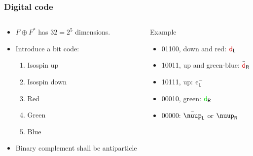 \documentclass[english, fleqn]{beamer}
\renewcommand\eup{\text e}
\begin{document}
\begin{frame}
    \frametitle{Digital code}

    \begin{columns}[t]
        \begin{column}{0.5\linewidth}
            \begin{itemize}
                \item
                    $F \oplus F^*$ has $32 = 2^5$ dimensions.
                \pause
                \item
                    Introduce a bit code:
                    \begin{enumerate}
                        \item Isospin up
                        \item Isospin down
                        \item \textcolor{qred}{Red}
                        \item \textcolor{qgreen}{Green}
                        \item \textcolor{qblue}{Blue}
                    \end{enumerate}
                \item
                    Binary complement shall be antiparticle
            \end{itemize}
        \end{column}
        \pause
        \begin{column}{0.5\linewidth}
            \begin{exampleblock}{Example}
                \begin{itemize}
                    \item 01100, down and red: $\textcolor{qred}{\mathsf d}_\mathsf L$
                    \item 10011, up and green-blue: $\bar{\textcolor{qred}{\mathsf d}}_\mathsf R$
                    \item 10111, up: $\eup^-_\mathsf L$
                    \item 00010, green: $\textcolor{qgreen}{\mathsf d}_\mathsf R$
                    \item 00000: $\bar\nuup_\mathsf L$ or $\nuup_\mathsf R$
                \end{itemize}
            \end{exampleblock}
        \end{column}
    \end{columns}
\end{frame}
\end{document}
